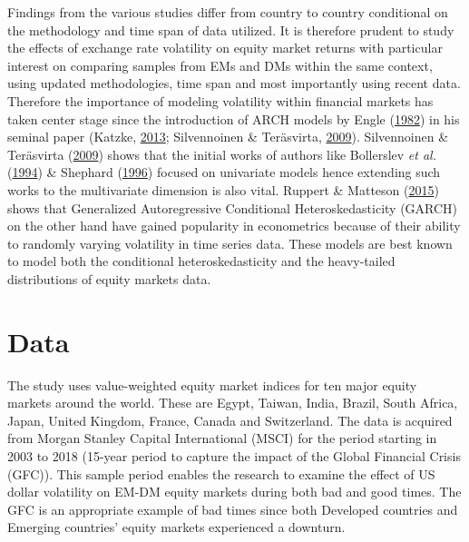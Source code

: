 \documentclass[11pt,preprint, authoryear]{elsarticle}
\numberwithin{equation}{section}
\numberwithin{figure}{section}
\numberwithin{table}{section}
\begin{document}
Findings from the various studies differ from country to country
conditional on the methodology and time span of data utilized. It is
therefore prudent to study the effects of exchange rate volatility on
equity market returns with particular interest on comparing samples from
EMs and DMs within the same context, using updated methodologies, time
span and most importantly using recent data. Therefore the importance of
modeling volatility within financial markets has taken center stage
since the introduction of ARCH models by Engle
(\protect\hyperlink{ref-engle1982}{1982}) in his seminal paper (Katzke,
\protect\hyperlink{ref-katzke2013}{2013}; Silvennoinen \& Teräsvirta,
\protect\hyperlink{ref-silvennoinen2009}{2009}). Silvennoinen \&
Teräsvirta (\protect\hyperlink{ref-silvennoinen2009}{2009}) shows that
the initial works of authors like Bollerslev \emph{et al.}
(\protect\hyperlink{ref-bollerslev1994}{1994}) \& Shephard
(\protect\hyperlink{ref-shephard1996}{1996}) focused on univariate
models hence extending such works to the multivariate dimension is also
vital. Ruppert \& Matteson (\protect\hyperlink{ref-ruppert2015}{2015})
shows that Generalized Autoregressive Conditional Heteroskedasticity
(GARCH) on the other hand have gained popularity in econometrics because
of their ability to randomly varying volatility in time series data.
These models are best known to model both the conditional
heteroskedasticity and the heavy-tailed distributions of equity markets
data.

\hypertarget{data}{%
\section{\texorpdfstring{Data \label{Data}}{Data }}\label{data}}

The study uses value-weighted equity market indices for ten major equity
markets around the world. These are Egypt, Taiwan, India, Brazil, South
Africa, Japan, United Kingdom, France, Canada and Switzerland. The data
is acquired from Morgan Stanley Capital International (MSCI) for the
period starting in 2003 to 2018 (15-year period to capture the impact of
the Global Financial Crisis (GFC)). This sample period enables the
research to examine the effect of US dollar volatility on EM-DM equity
markets during both bad and good times. The GFC is an appropriate
example of bad times since both Developed countries and Emerging
countries' equity markets experienced a downturn.
\end{document}
